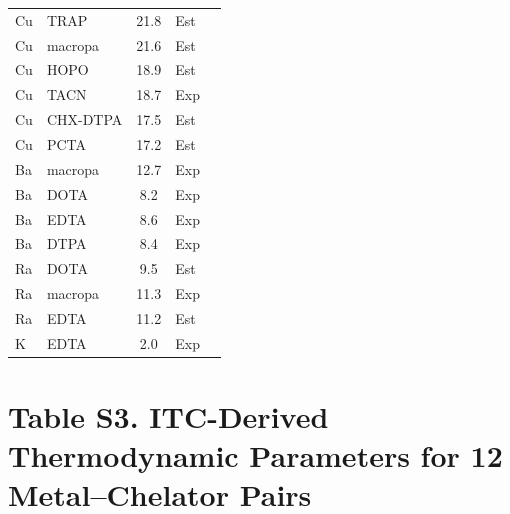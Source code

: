 \documentclass[journal=jacsat,manuscript=suppinfo]{achemso}
\begin{document}
\begin{longtable}{@{}llcp{1.5cm}c@{}}
  Cu & TRAP     & 21.8  & Est & \cite{MartellSmith2004,Hancock1989} \\
  Cu & macropa  & 21.6  & Est & \cite{MartellSmith2004,Hancock1989} \\
  Cu & HOPO     & 18.9  & Est & \cite{MartellSmith2004,Hancock1989} \\
  Cu & TACN     & 18.7  & Exp & \cite{MartellSmith2004} \\
  Cu & CHX-DTPA & 17.5  & Est & \cite{MartellSmith2004,Hancock1989} \\
  Cu & PCTA     & 17.2  & Est & \cite{MartellSmith2004,Hancock1989} \\
  Ba & macropa  & 12.7  & Exp & \cite{Blei2023} \\
  Ba & DOTA     & 8.2   & Exp & \cite{Blei2023} \\
  Ba & EDTA     & 8.6   & Exp & \cite{MartellSmith2004} \\
  Ba & DTPA     & 8.4   & Exp & \cite{MartellSmith2004} \\
  Ra & DOTA     & 9.5   & Est & \cite{MartellSmith2004,Hancock1989} \\
  Ra & macropa  & 11.3  & Exp & \cite{Blei2023} \\
  Ra & EDTA     & 11.2  & Est & \cite{MartellSmith2004,Hancock1989} \\
  K  & EDTA     & 2.0   & Exp & \cite{MartellSmith2004} \\
  \bottomrule
\end{longtable}

\newpage

\section*{Table S3. ITC-Derived Thermodynamic Parameters for 12 Metal--Chelator Pairs}
\label{tab:s3}
\end{document}
